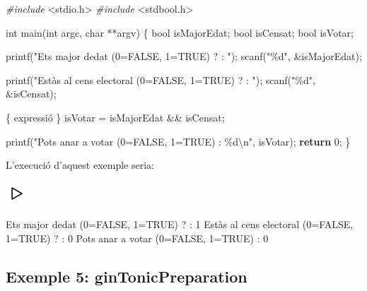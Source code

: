 \documentclass[
]{book}
\newenvironment{Shaded}{\begin{snugshade}}{\end{snugshade}}
\newcommand{\ControlFlowTok}[1]{\textcolor[rgb]{0.13,0.29,0.53}{\textbf{#1}}}
\newcommand{\DataTypeTok}[1]{\textcolor[rgb]{0.13,0.29,0.53}{#1}}
\newcommand{\DecValTok}[1]{\textcolor[rgb]{0.00,0.00,0.81}{#1}}
\newcommand{\ImportTok}[1]{#1}
\newcommand{\NormalTok}[1]{#1}
\newcommand{\PreprocessorTok}[1]{\textcolor[rgb]{0.56,0.35,0.01}{\textit{#1}}}
\newcommand{\SpecialCharTok}[1]{\textcolor[rgb]{0.00,0.00,0.00}{#1}}
\newcommand{\StringTok}[1]{\textcolor[rgb]{0.31,0.60,0.02}{#1}}
\begin{document}
\begin{Shaded}
\begin{Highlighting}[]
\PreprocessorTok{\#include }\ImportTok{\textless{}stdio.h\textgreater{}}
\PreprocessorTok{\#include }\ImportTok{\textless{}stdbool.h\textgreater{}}

\DataTypeTok{int}\NormalTok{ main(}\DataTypeTok{int}\NormalTok{ argc, }\DataTypeTok{char}\NormalTok{ **argv) \{}
    \DataTypeTok{bool}\NormalTok{ isMajorEdat;}
    \DataTypeTok{bool}\NormalTok{ isCensat;}
    \DataTypeTok{bool}\NormalTok{ isVotar;}

\NormalTok{    printf(}\StringTok{"Ets major d\textquotesingle{}edat (0=FALSE, 1=TRUE) ? : "}\NormalTok{);}
\NormalTok{    scanf(}\StringTok{"\%d"}\NormalTok{, \&isMajorEdat);}

\NormalTok{    printf(}\StringTok{"Estàs al cens electoral (0=FALSE, 1=TRUE) ? : "}\NormalTok{);}
\NormalTok{    scanf(}\StringTok{"\%d"}\NormalTok{, \&isCensat);}

\NormalTok{    \{ expressió \}}
\NormalTok{    isVotar = isMajorEdat \&\& isCensat;}

\NormalTok{    printf(}\StringTok{"Pots anar a votar (0=FALSE, 1=TRUE) : \%d}\SpecialCharTok{\textbackslash{}n}\StringTok{"}\NormalTok{, isVotar);}
    \ControlFlowTok{return} \DecValTok{0}\NormalTok{;}
\NormalTok{\}}
\end{Highlighting}
\end{Shaded}

L'execució d'aquest exemple seria:

\includegraphics{./img/play.png}

\begin{Shaded}
\begin{Highlighting}[]
\NormalTok{Ets major d\textquotesingle{}edat (}\DecValTok{0}\NormalTok{=FALSE, }\DecValTok{1}\NormalTok{=TRUE) ? : }\DecValTok{1}
\NormalTok{Estàs al cens electoral (}\DecValTok{0}\NormalTok{=FALSE, }\DecValTok{1}\NormalTok{=TRUE) ? : }\DecValTok{0}
\NormalTok{Pots anar a votar (}\DecValTok{0}\NormalTok{=FALSE, }\DecValTok{1}\NormalTok{=TRUE) : }\DecValTok{0}
\end{Highlighting}
\end{Shaded}

\hypertarget{exemple-5-gintonicpreparation}{%
\subsection{Exemple 5: ginTonicPreparation}\label{exemple-5-gintonicpreparation}}
\end{document}
